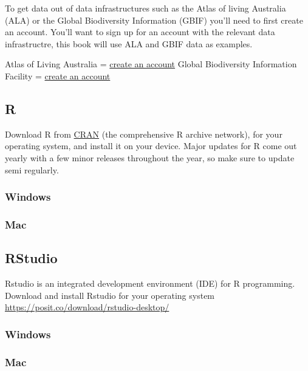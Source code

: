 \documentclass[
  letterpaper,
  DIV=11,
  numbers=noendperiod,
  oneside]{scrreprt}
\begin{document}
To get data out of data infrastructures such as the Atlas of living
Australia (ALA) or the Global Biodiversity Information (GBIF) you'll
need to first create an account. You'll want to sign up for an account
with the relevant data infrastructre, this book will use ALA and GBIF
data as examples.

Atlas of Living Australia =
\href{https://auth.ala.org.au/userdetails/registration/createAccount}{create
an account} Global Biodiversity Information Facility =
\href{https://www.gbif.org/user/profile}{create an account}

\hypertarget{r}{%
\subsection{R}\label{r}}

Download R from \href{https://cloud.r-project.org/}{CRAN} (the
comprehensive R archive network), for your operating system, and install
it on your device. Major updates for R come out yearly with a few minor
releases throughout the year, so make sure to update semi regularly.

\hypertarget{windows}{%
\subsubsection*{Windows}\label{windows}}

\hypertarget{mac}{%
\subsubsection*{Mac}\label{mac}}

\hypertarget{rstudio}{%
\subsection{RStudio}\label{rstudio}}

Rstudio is an integrated development environment (IDE) for R
programming. Download and install Rstudio for your operating system
\url{https://posit.co/download/rstudio-desktop/}

\hypertarget{windows-1}{%
\subsubsection*{Windows}\label{windows-1}}

\hypertarget{mac-1}{%
\subsubsection*{Mac}\label{mac-1}}
\end{document}
